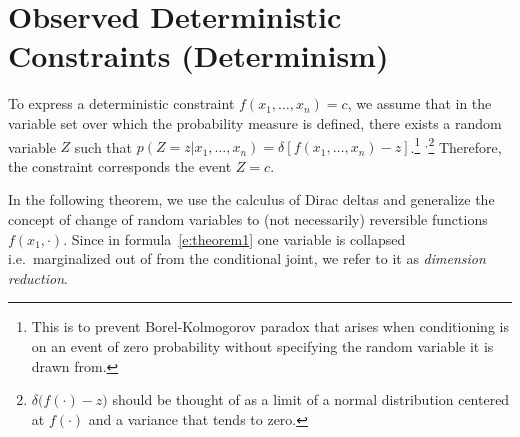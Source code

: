 \documentclass{article} %
\newcommand{\pr}{p}
\begin{document}

\section{Observed Deterministic Constraints (Determinism)}\label{sect:determinism}

To express a deterministic constraint $f(x_1, \ldots, x_n) = c$, we assume that
in the variable set over which the probability measure is defined, there exists 
a random variable $Z$ such that $\pr(Z=z | x_1, \ldots, x_n) = \delta[f(x_1, \ldots, x_n) - z]$.\footnote{
This is to prevent Borel-Kolmogorov paradox \cite{kolmogorov1950foundations}
that arises when conditioning is on an event of zero probability
without specifying the random variable it is drawn from. %
} $^{,}$\footnote{
$\delta\big( f(\cdot) - z\big)$ should be thought of as a limit of a normal distribution centered at $f(\cdot)$ and a variance that tends to zero.
} 
Therefore, the constraint corresponds the event $Z=c$.

In the following theorem, we use the calculus of Dirac deltas and generalize the concept of change of random variables to (not necessarily) reversible functions $f(x_1, \cdot)$.
Since in formula~\ref{e:theorem1} one variable is collapsed i.e.\ marginalized out of from the conditional joint, we refer to it as \emph{dimension reduction}. 
\end{document}
